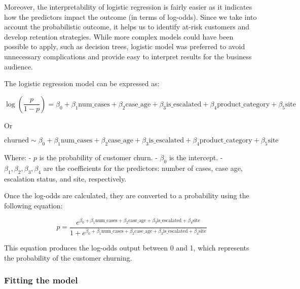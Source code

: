 \documentclass[
]{article}
\begin{document}
Moreover, the interpretability of logistic regression is fairly easier as it indicates how the predictors impact the outcome (in terms of log-odds). Since we take into account the probabilistic outcome, it helps us to identify at-risk customers and develop retention strategies. While more complex models could have been possible to apply, such as decision trees, logistic model was preferred to avoid unnecessary complications and provide easy to interpret results for the business audience.

The logistic regression model can be expressed as:

\[
\log\left(\frac{p}{1-p}\right) = \beta_0 + \beta_1 \text{num\_cases} + \beta_2 \text{case\_age} + \beta_3 \text{is\_escalated} + \beta_4 \text{product\_category} + \beta_5 \text{site}
\]

Or

\[
\text{churned} \sim \beta_0 + \beta_1 \text{num\_cases} + \beta_2 \text{case\_age} + \beta_3 \text{is\_escalated} + \beta_4 \text{product\_category} + \beta_5 \text{site}
\]

Where:
- \(p\) is the probability of customer churn.
- \(\beta_0\) is the intercept.
- \(\beta_1, \beta_2, \beta_3, \beta_4\) are the coefficients for the predictors: number of cases, case age, escalation status, and site, respectively.

Once the log-odds are calculated, they are converted to a probability using the following equation:

\[
p = \frac{e^{\beta_0 + \beta_1 \text{num\_cases} + \beta_2 \text{case\_age} + \beta_3 \text{is\_escalated} + \beta_4 \text{site}}}{1 + e^{\beta_0 + \beta_1 \text{num\_cases} + \beta_2 \text{case\_age} + \beta_3 \text{is\_escalated} + \beta_4 \text{site}}}
\]

This equation produces the log-odds output between 0 and 1, which represents the probability of the customer churning.

\subsubsection{Fitting the model}\label{fitting-the-model}
\end{document}

